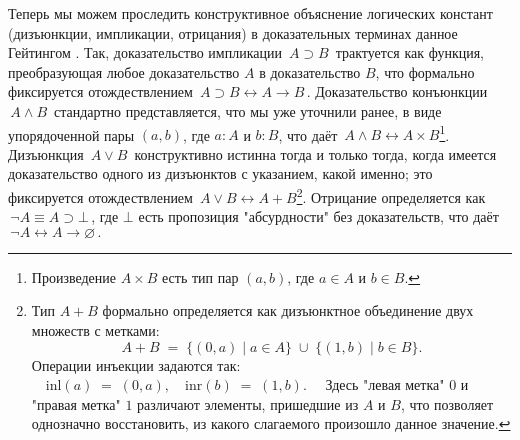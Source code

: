 \documentclass[14pt]{extarticle}
\begin{document}
	Теперь мы можем проследить конструктивное объяснение логических констант (дизъюнкции, импликации, отрицания) в доказательных терминах данное Гейтингом \cite[123]{heyting1965intuitionism}. Так, доказательство импликации  
	\(\,A\supset B\,\)  
	трактуется как функция, преобразующая любое доказательство \(A\) в доказательство \(B\), что формально фиксируется отождествлением  
	\(\,A\supset B\longleftrightarrow A\to B\,.\)  
	Доказательство конъюнкции  
	\(\,A\wedge B\,\)  
	стандартно представляется, что мы уже уточнили ранее, в виде упорядоченной пары \((a,b)\), где \(a:A\) и \(b:B\), что даёт  
	\(\,A\wedge B\longleftrightarrow A\times B\)\footnote{Произведение \(A\times B\) есть тип пар \((a,b)\), где \(a\in A\) и \(b\in B\).}. Дизъюнкция  
	\(\,A\vee B\,\)  
	конструктивно истинна тогда и только тогда, когда имеется доказательство одного из дизъюнктов с указанием, какой именно; это фиксируется отождествлением  
	\(\,A\vee B\longleftrightarrow A + B\)\footnote{Тип \(A + B\) формально определяется как дизъюнктное объединение двух множеств с метками:
		\[
		A + B \;=\; \{(0,a)\mid a\in A\}\;\cup\;\{(1,b)\mid b\in B\}.
		\]
		Операции инъекции задаются так:
		\(
		\quad \mathrm{inl}(a) \;=\; (0,a),\quad
		\mathrm{inr}(b) \;=\; (1,b). \quad
		\)
		Здесь "левая метка" \(0\) и "правая метка" \(1\) различают элементы, пришедшие из \(A\) и \(B\), что позволяет однозначно восстановить, из какого слагаемого произошло данное значение.}. Отрицание определяется как  
	\(\,\neg A \equiv A \supset \bot\,\),  
	где \(\bot\) есть пропозиция "абсурдности" без доказательств, что даёт  
	\(\,\neg A \longleftrightarrow A \to \varnothing\,.\)
	
\end{document}
